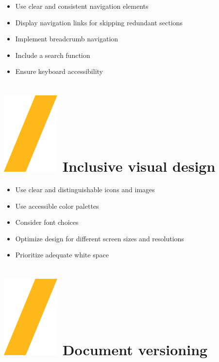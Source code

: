 \documentclass[a0paper,fleqn]{src/betterposter}
\begin{document}
{\begin{itemize}
\item Use clear and consistent navigation elements
\item Display navigation links for skipping redundant sections
\item Implement breadcrumb navigation
\item Include a search function
\item Ensure keyboard accessibility
\end{itemize}

}{

\section{\includegraphics[height=\fontcharht\font`\S]{img/general/slash.png} Inclusive visual design}

\begin{itemize}
\item Use clear and distinguishable icons and images
\item Use accessible color palettes
\item Consider font choices
\item Optimize design for different screen sizes and resolutions
\item Prioritize adequate white space
\end{itemize}

\section{\includegraphics[height=\fontcharht\font`\S]{img/general/slash.png} Document versioning}

}
\end{document}
